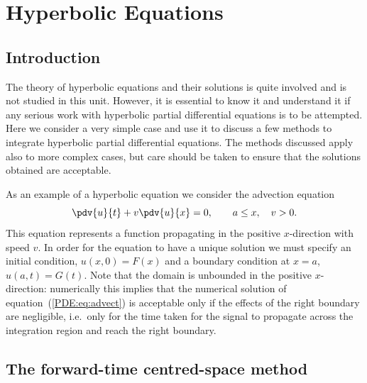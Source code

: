 \section{Hyperbolic Equations}

\subsection{Introduction}

The theory of hyperbolic equations and their solutions is quite
involved and is not studied in this unit.  However, it is essential to
know it and understand it if any serious work with hyperbolic partial
differential equations is to be attempted.  Here we consider a very
simple case and use it to discuss a few methods to integrate
hyperbolic partial differential equations.  The methods discussed
apply also to more complex cases, but care should be taken to ensure
that the solutions obtained are acceptable.

As an example of a hyperbolic equation we consider the advection
equation
%
\begin{equation}
  \pdv{u}{t} + v \pdv{u}{x} = 0 , \qquad a \le x, \quad v > 0 .
  \label{PDE:eq:advect}
\end{equation}
%
This equation represents a function propagating in the positive
$x$-direction with speed $v$.  In order for the equation to have a
unique solution we must specify an initial condition, $u(x,0) = F(x)$
and a boundary condition at $x=a$, $u(a,t) = G(t)$.  Note that the
domain is unbounded in the positive $x$-direction: numerically this
implies that the numerical solution of equation~(\ref{PDE:eq:advect})
is acceptable only if the effects of the right boundary are
negligible, i.e.\ only for the time taken for the signal to propagate
across the integration region and reach the right boundary.

\subsection{The forward-time centred-space method}

